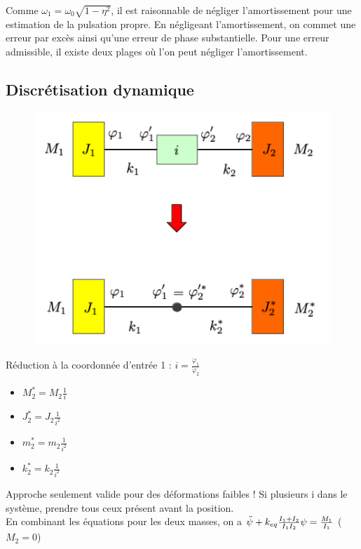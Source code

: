 \documentclass[../main.tex]{subfiles}
\begin{document}
Comme $\omega_1 = \omega_0 \sqrt{1-\eta^2}$, il est raisonnable de négliger l'amortissement pour une estimation de la pulsation propre. En négligeant l'amortissement, on commet une erreur par excès ainsi qu'une erreur de phase substantielle. Pour une erreur admissible, il existe deux plages où l'on peut négliger l'amortissement.\\

\subsection{Discrétisation dynamique}

\begin{figure}[hbt!]
    \centering
    \includegraphics[width=.6\textwidth]{IMAGES/constru/dsm1.png}
\end{figure}

Réduction à la coordonnée d'entrée 1 : $i = \frac{\dot{\varphi}_1}{\dot{\varphi}_2}$\\
\begin{itemize}
    \item $M_2^* = M_2 \frac{1}{i}$\\
    \item $J_2^* = J_2 \frac{1}{i^2}$\\
    \item $m_2^* = m_2 \frac{1}{i^2}$\\
    \item $k_2^* = k_2 \frac{1}{i^2}$\\
\end{itemize}

\warning Approche seulement valide pour des déformations faibles ! Si plusieurs i dans le système, prendre tous ceux présent avant la position.\\

En combinant les équations pour les deux masses, on a $\Ddot{\psi} + k_{eq} \frac{I_1 + I_2}{I_1I_2} \psi = \frac{M_1}{I_1}$ ($M_2= 0$)\\
\end{document}
